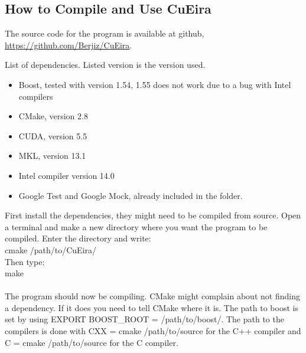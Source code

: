 \documentclass[10pt,a4paper]{report}
\begin{document}
\begin{appendices}
\chapter{How to Compile and Use CuEira}
\label{compile_cueira}
The source code for the program is available at github, \url{https://github.com/Berjiz/CuEira}.

\begin{description}
    \item[List of dependencies. Listed version is the version used.]
\end{description}
\begin{itemize}
 \item Boost, tested with version 1.54, 1.55 does not work due to a bug with Intel compilers
 \item CMake, version 2.8
 \item CUDA, version 5.5
 \item MKL, version 13.1
 \item Intel compiler version 14.0
 \item Google Test and Google Mock, already included in the folder.
\end{itemize}

First install the dependencies, they might need to be compiled from source. Open a terminal and make a new directory where you want the program to be compiled. Enter the directory and write:\\
cmake /path/to/CuEira/\\
Then type:\\
make\\
\\
The program should now be compiling. CMake might complain about not finding a dependency. If it does you need to tell CMake where it is. The path to boost is set by using EXPORT BOOST\_ROOT = /path/to/boost/. The path to the compilers is done with CXX = cmake /path/to/source for the C++ compiler and C = cmake /path/to/source for the C compiler.


\end{appendices}
\end{document}
